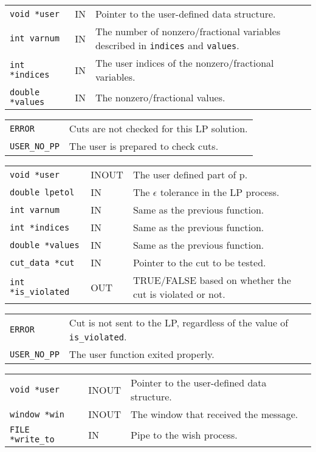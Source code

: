 \documentclass[twoside,11pt]{article}
\begin{document}
{\newpage
\clearpage
\samepage \begin{tabular}{llp{285pt}}
{\tt void *user} & IN & Pointer to the user-defined data structure. \\ 
{\tt int varnum} & IN & The number of nonzero/fractional variables described
in {\tt indices} and {\tt values}. \\ 
{\tt int *indices} & IN & The user indices of the nonzero/fractional
variables. \\ 
{\tt double *values} & IN & The nonzero/fractional values. \\  
\end{tabular}
}

{\newpage
\clearpage
\samepage \begin{tabular}{lp{300pt}}
{\tt ERROR} & Cuts are not checked for this LP solution. \\ 
{\tt USER\_NO\_PP} & The user is prepared to check cuts. \\ 
\end{tabular}
}

{\newpage
\clearpage
\samepage \begin{tabular}{llp{255pt}}
{\tt void *user} & INOUT & The user defined part of p. \\ 
{\tt double lpetol} & IN & The $\epsilon$ tolerance in the LP process. \\ 
{\tt int varnum} & IN & Same as the previous function. \\ 
{\tt int *indices} & IN & Same as the previous function. \\ 
{\tt double *values} & IN & Same as the previous function. \\ 
{\tt cut\_data *cut} & IN & Pointer to the cut to be tested. \\ 
{\tt int *is\_violated} & OUT & TRUE/FALSE based on whether the cut is violated
or not. \\ 
\end{tabular}
}

{\newpage
\clearpage
\samepage \begin{tabular}{lp{300pt}}
{\tt ERROR} & Cut is not sent to the LP, regardless of the value of
{\tt *is\_violated}. \\ 
{\tt USER\_NO\_PP} & The user function exited properly. \\ 
\end{tabular}
}

{\newpage
\clearpage
\samepage \begin{tabular}{llp{250pt}}
{\tt void *user} & INOUT & Pointer to the user-defined data structure. \\ 
{\tt window *win} & INOUT & The window that received the message. \\ 
{\tt FILE *write\_to} & IN & Pipe to the wish process. \\ 
\end{tabular}
}
\end{document}
